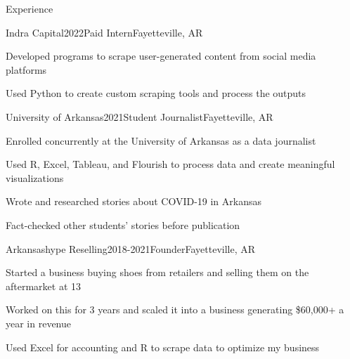 \documentclass{resume}
\begin{document}
    \begin{rSection}{Experience}
        \begin{rSubsection}{Indra Capital}{2022}{Paid Intern}{Fayetteville, AR}
            \item Developed programs to scrape user-generated content from social media platforms
            \item Used Python to create custom scraping tools and process the outputs
        \end{rSubsection}

        \begin{rSubsection}{University of Arkansas}{2021}{Student Journalist}{Fayetteville, AR}
            \item Enrolled concurrently at the University of Arkansas as a data journalist
            \item Used R, Excel, Tableau, and Flourish to process data and create meaningful visualizations
            \item Wrote and researched stories about COVID-19 in Arkansas
            \item Fact-checked other students' stories before publication
        \end{rSubsection}

        \begin{rSubsection}{Arkansashype Reselling}{2018-2021}{Founder}{Fayetteville, AR}
            \item Started a business buying shoes from retailers and selling them on the aftermarket at 13
            \item Worked on this for 3 years and scaled it into a business generating \$60,000+ a year in revenue
            \item Used Excel for accounting and R to scrape data to optimize my business
        \end{rSubsection}
    \end{rSection}
\end{document}
